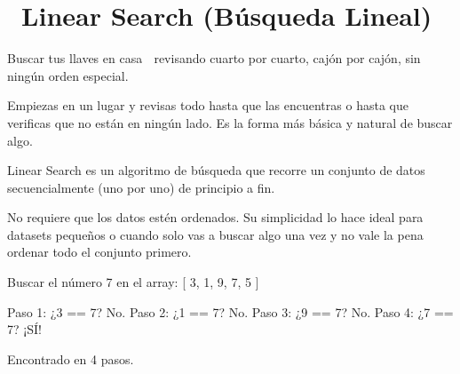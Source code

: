 ﻿\chapter[\emj{👁️}~Linear Search (Búsqueda Lineal)]{~Linear Search (Búsqueda Lineal)}

\begin{dsaquees}

Buscar tus llaves en casa 🔑 revisando cuarto por cuarto, cajón por
cajón, sin ningún orden especial. 

Empiezas en un lugar y revisas todo hasta que las encuentras o hasta
que verificas que no están en ningún lado. Es la forma más básica y 
natural de buscar algo.

\end{dsaquees}

\begin{dsaotraforma}

Linear Search es un algoritmo de búsqueda que recorre un conjunto de
datos secuencialmente (uno por uno) de principio a fin. 

No requiere que los datos estén ordenados. Su simplicidad lo hace
ideal para datasets pequeños o cuando solo vas a buscar algo una vez
y no vale la pena ordenar todo el conjunto primero.

\end{dsaotraforma}

\begin{dsadiagrama}
Buscar el número 7 en el array:
[ 3, 1, 9, 7, 5 ]

Paso 1: ¿3 == 7? No.
Paso 2: ¿1 == 7? No.
Paso 3: ¿9 == 7? No.
Paso 4: ¿7 == 7? ¡SÍ! 🎉

Encontrado en 4 pasos.
\end{dsadiagrama}

